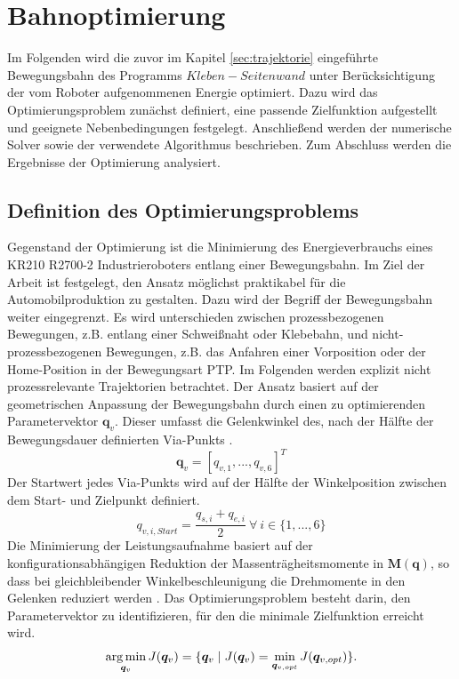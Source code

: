 \chapter{Bahnoptimierung}
\label{cha:Bahnoptimierung}
Im Folgenden wird die zuvor im Kapitel \ref{sec:trajektorie} eingeführte Bewegungsbahn des Programms $Kleben-Seitenwand$ unter Berücksichtigung der vom Roboter aufgenommenen Energie optimiert. Dazu wird das Optimierungsproblem zunächst definiert, eine passende Zielfunktion aufgestellt und geeignete Nebenbedingungen festgelegt. Anschließend werden der numerische Solver sowie der verwendete Algorithmus beschrieben. Zum Abschluss werden die Ergebnisse der  Optimierung analysiert. 
%
\section{Definition des Optimierungsproblems}
Gegenstand der Optimierung ist die Minimierung des Energieverbrauchs eines KR210 R2700-2 Industrieroboters entlang einer Bewegungsbahn. Im Ziel der Arbeit ist festgelegt, den Ansatz möglichst praktikabel für die Automobilproduktion zu gestalten. Dazu wird der Begriff der Bewegungsbahn weiter eingegrenzt. Es wird unterschieden zwischen prozessbezogenen Bewegungen, z.B. entlang einer Schweißnaht oder Klebebahn, und nicht-prozessbezogenen Bewegungen, z.B. das Anfahren einer Vorposition oder der Home-Position in der Bewegungsart PTP. Im Folgenden werden explizit nicht prozessrelevante Trajektorien betrachtet. Der Ansatz basiert auf der geometrischen Anpassung  der Bewegungsbahn durch einen zu optimierenden Parametervektor $\bm{q}_{v}$. Dieser umfasst die Gelenkwinkel des, nach der Hälfte der Bewegungsdauer definierten Via-Punkts \cite[S~532~ f.]{Ziaukas.2017}.
%
\begin{equation}
	\label{eqn:parametervektor}
	\bm{q}_{v} = [q_{v,1},...,q_{v,6}]^T 
\end{equation}
%
Der Startwert jedes Via-Punkts wird auf der Hälfte der Winkelposition zwischen dem Start- und Zielpunkt definiert.
\begin{equation}
	\label{eqn:parametervektor-startkonfiguration}
	q_{v,i,Start} = \dfrac{q_{s,i}+q_{e,i}}{2} ~\forall~ i \in \{1,...,6\}
\end{equation}
Die Minimierung der Leistungsaufnahme basiert auf der konfigurationsabhängigen Reduktion der Massenträgheitsmomente in $\bm{M}(\bm{q})$, so dass bei gleichbleibender Winkelbeschleunigung die Drehmomente in den Gelenken reduziert werden \cite[S.~531]{Ziaukas.2017}. Das Optimierungsproblem besteht darin, den Parametervektor zu identifizieren, für den die minimale Zielfunktion erreicht wird.
%
\begin{equation}
	\operatorname*{arg\,min}_{\bm{q}_{v}} J(\bm{q}_{v}) = \{\bm{q}_{v} \mid J(\bm{q}_{v}) = \min_{\bm{q}_{v,opt}} J(\bm{q}_{v,opt})\}.
\end{equation}
%
